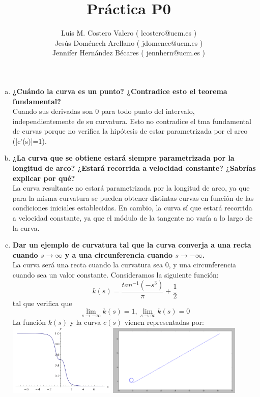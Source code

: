 \documentclass[12pt,a4paper]{article}
\title{Práctica P0}
\author{Luis M. Costero Valero ( lcostero@ucm.es )\\Jesús Doménech
  Arellano ( jdomenec@ucm.es )\\Jennifer Hernández Bécares (
  jennhern@ucm.es )}
\date{}
\begin{document}
 
\maketitle

\begin{enumerate}[(a)]
\item \textbf{¿Cuándo la curva es un punto? ¿Contradice esto el teorema fundamental?}\\
  Cuando sus derivadas son 0 para todo punto del intervalo,
  independientemente de su curvatura. Esto no contradice el tma fundamental
  de curvas porque no verifica la hipótesis de estar parametrizada por el
  arco (|c'(s)|=1).

\item \textbf{¿La curva que se obtiene estará siempre parametrizada por la
    longitud de arco? ¿Estará recorrida a velocidad constante? ¿Sabrías
    explicar por qué?}\\
  La curva resultante no estará parametrizada por la longitud de arco, ya
  que para la misma curvatura se pueden obtener distintas curvas en función
  de las condiciones iniciales establecidas. En cambio, la curva sí que
  estará recorrida a velocidad constante, ya que el módulo de la tangente
  no varía a lo largo de la curva.

\item \textbf{Dar un ejemplo de curvatura tal que la curva converja a una
    recta cuando $s \to \infty$ y a una circunferencia cuando $s \to
    -\infty$.}\\
  La curva será una recta cuando la curvatura sea 0, y una circunferencia
  cuando sea un valor constante. Consideramos la siguiente función:
  $$ k(s) = \frac{tan^{-1}(-s^{3})}{\pi}+\frac{1}{2} $$
  tal que verifica que $$\lim_{s\to-\infty}k(s)=1 , \lim_{s \to \infty}
  k(s) = 0$$
  La función $k(s)$ y la curva $c(s)$ vienen representadas por:\\
  
  \includegraphics[width=0.4\textwidth]{P0/f.png}\hspace{0.5cm}
  \includegraphics[width=0.5\textwidth]{P0/A.png}
  

\end{enumerate}
\end{document}
